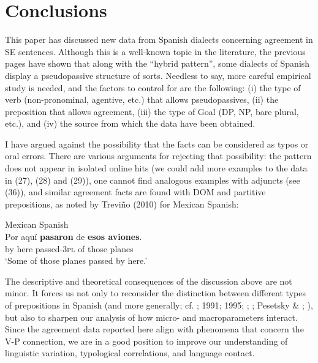 \documentclass[output=paper]{langsci/langscibook}
\begin{document}
\section{Conclusions}%
This paper has discussed new data from Spanish dialects concerning agreement in SE sentences. Although this is a well-known topic in the literature, the previous pages have shown that along with the “hybrid pattern”, some dialects of Spanish display a pseudopassive structure of sorts. Needless to say, more careful empirical study is needed, and the factors to control for are the following: (i) the type of verb (non-pronominal, agentive, etc.) that allows pseudopassives, (ii) the preposition that allows agreement, (iii) the type of Goal (DP, NP, bare plural, etc.), and (iv) the source from which the data have been obtained. 

I have argued against the possibility that the facts can be considered as typos or oral errors. There are various arguments for rejecting that possibility: the pattern does not appear in isolated online hits (we could add more examples to the data in (27), (28) and (29)), one cannot find analogous examples with adjuncts (see (36)), and similar agreement facts are found with DOM and partitive prepositions, as noted by Treviño (2010) for Mexican Spanish:

 
\ea%
    Mexican Spanish\label{ex:gallego:43}\\
    \gll Por  aquí   \textbf{pasaron}      de  \textbf{esos   aviones}. \\
         by    here  passed-\textsc{3pl}  of  those  planes\\
    \glt ‘Some of those planes passed by here.’
\z

The descriptive and theoretical consequences of the discussion above are not minor. It forces us not only to reconsider the distinction between different types of prepositions in Spanish (and more generally; cf. \citealt{Demonte1987}; 1991; 1995; \citealt{Abels2003}; \citealt{Cuervo2003}; Pesetsky \& \citealt{Torrego2004}; \citealt{Romero2011}), but also to sharpen our analysis of how micro- and macroparameters interact. Since the agreement data reported here align with phenomena that concern the V-P connection, we are in a good position to improve our understanding of linguistic variation, typological correlations, and language contact.
\end{document}
